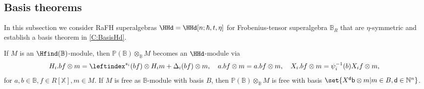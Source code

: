\documentclass[a4paper,11pt]{amsart}
\numberwithin{equation}{subsection}
\theoremstyle{definition}
\theoremstyle{theorem}
\theoremstyle{remark}
\newcommand\bd{\mathsf{d}}
\newcommand\bb{\mathsf{b}}
\newcommand\Po{\mathbb{P}(\mathbb{B})}
\newcommand\N{\mathbb{N}}
\newcommand\X{\mathbb{X}}
\newcommand\RR{R}
\newcommand{\Bo}{\mathbb{B}}
\begin{document}
\subsection{Basis theorems}
In this subsection we consider RaFH superalgebras
$\HHd=\HHd[n;\hbar,t,\eta]$ for Frobenius-tensor superalgebra $\Bo_\RR$ that are $\eta$-symmetric and establish a basis theorem in  \autoref{C:BasisHd}.

\begin{Proposition}\label{AddPo}
If $M$ is an  $\Hfind(\Bo)$-module, then $\Po\otimes_{\Bo}M$ becomes an $\HHd$-module via \begin{equation*}
H_i. bf\otimes m=\leftindex^{s_i}(bf)\otimes H_im+\Delta_i(bf)\otimes m,\quad a. bf\otimes m=a.bf\otimes m, \quad  X_i.bf\otimes m=\psi_i^{-1}(b)X_i f\otimes m,
\end{equation*}
for  $a,b\in\Bo, f\in\RR[\X], m\in M$. If $M$ is free as $\Bo$-module with basis $B$, then $\Po\otimes_{\Bo}M$ is free with basis $\set{ X^\bd \bb\otimes m|m\in B,   \bd\in\N^n}$.
\end{Proposition}
\end{document}
